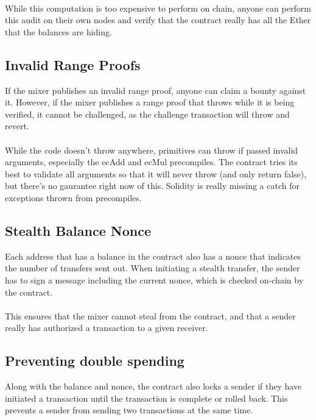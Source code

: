 \documentclass{article}
\begin{document}
\paragraph{}
While this computation is too expensive to perform on chain, anyone can perform this audit on their own nodes and verify that the contract really has all the Ether that the balances are hiding. 

\subsection{Invalid Range Proofs}
If the mixer publishes an invalid range proof, anyone can claim a bounty against it. However, if the mixer publishes a range proof that throws while it is being verified, it cannot be challenged, as the challenge transaction will throw and revert. 
\paragraph{}
While the code doesn't throw anywhere, primitives can throw if passed invalid arguments, especially the ecAdd and ecMul precompiles. The contract tries its best to validate all arguments so that it will never throw (and only return false), but there's no gaurantee right now of this. Solidity is really missing a catch{} for exceptions thrown from precompiles. 

\subsection{Stealth Balance Nonce}
Each address that has a balance in the contract also has a nonce that indicates the number of transfers sent out. When initiating a stealth transfer, the sender has to sign a message including the current nonce, which is checked on-chain by the contract. 
\paragraph{}
This ensures that the mixer cannot steal from the contract, and that a sender really has authorized a transaction to a given receiver. 

\subsection{Preventing double spending}
Along with the balance and nonce, the contract also locks a sender if they have initiated a transaction until the transaction is complete or rolled back. This prevents a sender from sending two transactions at the same time. 
\end{document}
